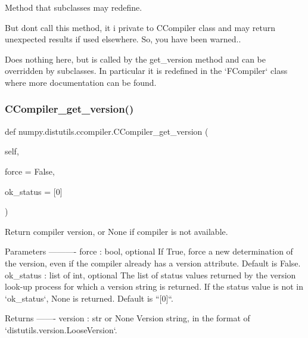 Method that subclasses may redefine. 

But don\textquotesingle{}t call this method, it i private to C\+Compiler class and may return unexpected results if used elsewhere. So, you have been warned.. \begin{DoxyVerb}Does nothing here, but is called by the get_version method and can be
overridden by subclasses. In particular it is redefined in the `FCompiler`
class where more documentation can be found.\end{DoxyVerb}
 \mbox{\label{namespacenumpy_1_1distutils_1_1ccompiler_a872f06ad4c12afcc6a5ec593beb094f7}} 
\subsubsection{\texorpdfstring{C\+Compiler\+\_\+get\+\_\+version()}{CCompiler\_get\_version()}}
{\footnotesize\ttfamily def numpy.\+distutils.\+ccompiler.\+C\+Compiler\+\_\+get\+\_\+version (\begin{DoxyParamCaption}\item[{}]{self,  }\item[{}]{force = {\ttfamily False},  }\item[{}]{ok\+\_\+status = {\ttfamily \mbox{[}0\mbox{]}} }\end{DoxyParamCaption})}

\begin{DoxyVerb}Return compiler version, or None if compiler is not available.

Parameters
----------
force : bool, optional
    If True, force a new determination of the version, even if the
    compiler already has a version attribute. Default is False.
ok_status : list of int, optional
    The list of status values returned by the version look-up process
    for which a version string is returned. If the status value is not
    in `ok_status`, None is returned. Default is ``[0]``.

Returns
-------
version : str or None
    Version string, in the format of `distutils.version.LooseVersion`.\end{DoxyVerb}
 \mbox{\label{namespacenumpy_1_1distutils_1_1ccompiler_a94bc265712bf86681f2d77de6513c511}} 
